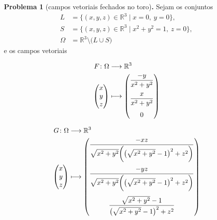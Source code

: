\documentclass[11pt]{article}
\newcommand{\R}{\mathbb R}
\begin{document}
\noindent\textbf{Problema 1} (campos vetoriais fechados no toro)\textbf{.} 
Sejam os conjuntos
\begin{align*}
L &= \{(x,y,z)\in\R^3 \mid x=0,~y=0\},\\
S &= \{(x,y,z)\in\R^3 \mid x^2+y^2=1,~z=0\},\\
\Omega &= \R^3 \setminus \big(L \cup S)
\end{align*}
e os campos vetoriais
\vspace{-0.25cm}
\begin{center}
\begin{minipage}[t]{0.3\linewidth}
\begin{align*}
F\colon\Omega&\longrightarrow\R^3\\
\begin{pmatrix} x \\ y \\ z\end{pmatrix}
&\longmapsto
\begin{pmatrix} 
\dfrac{-y}{x^2+y^2}
\vspace{.25cm}\\
\dfrac{x}{x^2+y^2}
\vspace{.25cm}\\ 
0
\end{pmatrix}
\end{align*}
\end{minipage}
\begin{minipage}[t]{0.68\linewidth}
\begin{align*}
G\colon\Omega&\longrightarrow\R^3\\
\begin{pmatrix} x \\ y \\ z\end{pmatrix}
&\longmapsto
\begin{pmatrix} 
\dfrac{-xz}{\sqrt{x^2+y^2}\bigg(\big(\sqrt{x^2+y^2}-1\big)^2+z^2\bigg)}
\vspace{.25cm}\\
\dfrac{-yz}{\sqrt{x^2+y^2}\bigg(\big(\sqrt{x^2+y^2}-1\big)^2+z^2\bigg)}
\vspace{.25cm}\\ 
\dfrac{\sqrt{x^2+y^2}-1}{\big(\sqrt{x^2+y^2}-1\big)^2+z^2}
\end{pmatrix}
\end{align*}
\end{minipage}
\end{center}
\end{document}
